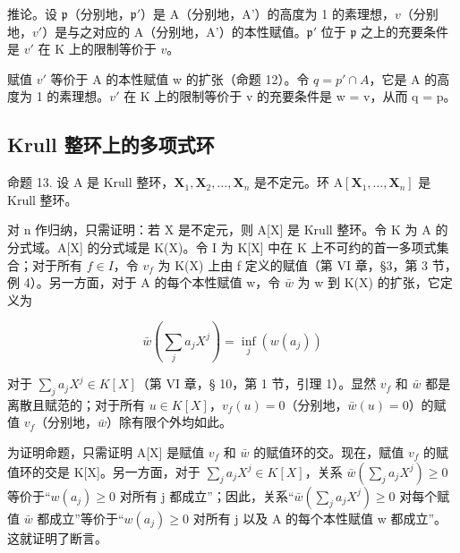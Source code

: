 推论。设 \(\mathfrak{p}\)（分别地，\(\mathfrak{p}'\)）是 A（分别地，A'）的高度为 1 的素理想，\(v\)（分别地，\(v'\)）是与之对应的 A（分别地，A'）的本性赋值。\(\mathfrak{p}'\) 位于 \(\mathfrak{p}\) 之上的充要条件是 \(v'\) 在 K 上的限制等价于 \(v\)。

赋值 \(v'\) 等价于 A 的本性赋值 w 的扩张（命题 12）。令 \(q = p' \cap A\)，它是 A 的高度为 1 的素理想。\(v'\) 在 K 上的限制等价于 v 的充要条件是 w = v，从而 q = p。

\subsection{Krull 整环上的多项式环}

命题 13. 设 A 是 Krull 整环，\(\mathbf{X}_1, \mathbf{X}_2, \ldots, \mathbf{X}_n\) 是不定元。环 \(\mathrm{A}[\mathbf{X}_1, \ldots, \mathbf{X}_n]\) 是 Krull 整环。

对 n 作归纳，只需证明：若 X 是不定元，则 A{[}X{]} 是 Krull 整环。令 K 为 A 的分式域。A{[}X{]} 的分式域是 K(X)。令 I 为 K{[}X{]} 中在 K 上不可约的首一多项式集合；对于所有 \(f \in I\)，令 \(v_{f}\) 为 K(X) 上由 f 定义的赋值（第 VI 章，§3，第 3 节，例 4）。另一方面，对于 A 的每个本性赋值 w，令 \(\bar{w}\) 为 w 到 K(X) 的扩张，它定义为

\[
\bar {w} \left(\sum_ {j} a _ {j} X ^ {j}\right) = \inf _ {j} (w (a _ {j}))
\]

对于 \(\sum_{j} a_j X^j \in K[X]\)（第 VI 章，§ 10，第 1 节，引理 1）。显然 \(v_f\) 和 \(\bar{w}\) 都是离散且赋范的；对于所有 \(u \in K[X]\)，\(v_f(u) = 0\)（分别地，\(\bar{w}(u) = 0\)）的赋值 \(v_f\)（分别地，\(\bar{w}\)）除有限个外均如此。

为证明命题，只需证明 A{[}X{]} 是赋值 \(v_{f}\) 和 \(\bar{w}\) 的赋值环的交。现在，赋值 \(v_{f}\) 的赋值环的交是 K{[}X{]}。另一方面，对于 \(\sum_{j} a_{j} X^{j} \in K[X]\)，关系 \(\bar{w}\left(\sum_{j} a_{j} X^{j}\right) \geqslant 0\) 等价于“\(w(a_{j}) \geqslant 0\) 对所有 j 都成立”；因此，关系“\(\bar{w}\left(\sum_{j} a_{j} X^{j}\right) \geqslant 0\) 对每个赋值 \(\bar{w}\) 都成立”等价于“\(w(a_{j}) \geqslant 0\) 对所有 j 以及 A 的每个本性赋值 w 都成立”。这就证明了断言。

